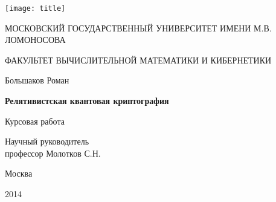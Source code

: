 \begin{titlepage}
  \centerline{\texttt{[image: title]}}
  \centerline{МОСКОВСКИЙ ГОСУДАРСТВЕННЫЙ УНИВЕРСИТЕТ ИМЕНИ М.В. ЛОМОНОСОВА}
  \centerline{ФАКУЛЬТЕТ ВЫЧИСЛИТЕЛЬНОЙ МАТЕМАТИКИ И КИБЕРНЕТИКИ}
  \centerline{\hfill\hrulefill\hrulefill\hfill}
  \vfill
  \vfill
  \vfill
  \large
  \centerline{Большаков Роман}
  \vfill
  \Large
  \begin{center}
  {\bf{Релятивистская квантовая криптография}}
  \end{center}
  \normalsize
  \vfill
  \vfill
  \centerline{Курсовая работа}
  \vfill
  \vfill
  \begin{flushright}
  Научный руководитель\\
  профессор Молотков С.Н.
  \end{flushright}
  \vfill
  \vfill
  \centerline{Москва}
  \centerline{2014}
  \end{titlepage}